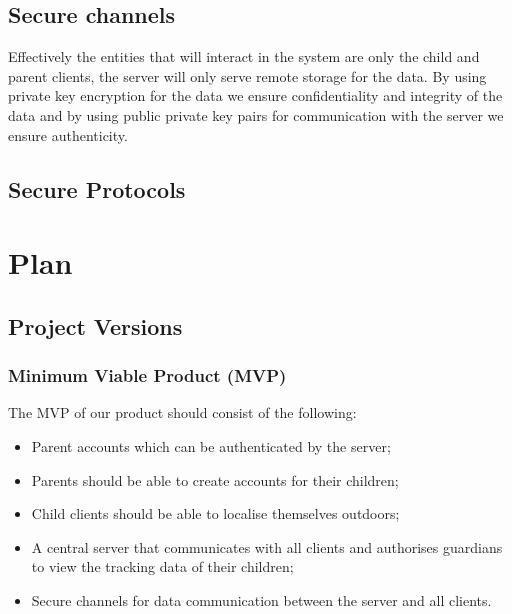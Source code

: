 \documentclass[a4paper]{article}
\begin{document}
\subsection{Secure channels}
Effectively the entities that will interact in the system are only the child and parent clients,
the server will only serve remote storage for the data. By using private key encryption for the data
we ensure confidentiality and integrity of the data and by using public private key pairs for communication
with the server we ensure authenticity.

\subsection{Secure Protocols}


\section{Plan}

\subsection{Project Versions}


\subsubsection{Minimum Viable Product (MVP)}
The MVP of our product should consist of the following:
\begin{itemize}
    \item Parent accounts which can be authenticated by the server;
    \item Parents should be able to create accounts for their children;
    \item Child clients should be able to localise themselves outdoors;
    \item A central server that communicates with all clients and authorises guardians to view the tracking data of their children;
    \item Secure channels for data communication between the server and all clients.
\end{itemize}
\end{document}
